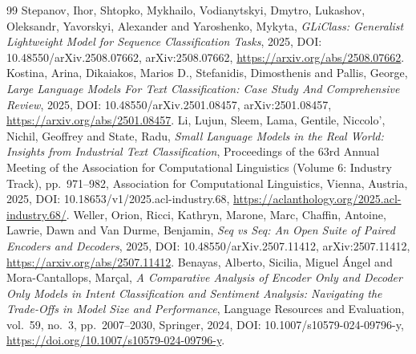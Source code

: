 \documentclass[10pt]{article}
\begin{document}
\begin{thebibliography}{99}
 Stepanov, Ihor, Shtopko, Mykhailo, Vodianytskyi, Dmytro, Lukashov, Oleksandr, Yavorskyi, Alexander and Yaroshenko, Mykyta, \emph{{GLiClass}: Generalist Lightweight Model for Sequence Classification Tasks}, 2025, DOI: 10.48550/arXiv.2508.07662, arXiv:2508.07662, \url{https://arxiv.org/abs/2508.07662}.
 Kostina, Arina, Dikaiakos, Marios D., Stefanidis, Dimosthenis and Pallis, George, \emph{Large Language Models For Text Classification: Case Study And Comprehensive Review}, 2025, DOI: 10.48550/arXiv.2501.08457, arXiv:2501.08457, \url{https://arxiv.org/abs/2501.08457}.
 Li, Lujun, Sleem, Lama, Gentile, Niccolo', Nichil, Geoffrey and State, Radu, \emph{Small Language Models in the Real World: Insights from Industrial Text Classification}, Proceedings of the 63rd Annual Meeting of the Association for Computational Linguistics (Volume 6: Industry Track), pp.~971--982, Association for Computational Linguistics, Vienna, Austria, 2025, DOI: 10.18653/v1/2025.acl-industry.68, \url{https://aclanthology.org/2025.acl-industry.68/}.
 Weller, Orion, Ricci, Kathryn, Marone, Marc, Chaffin, Antoine, Lawrie, Dawn and Van Durme, Benjamin, \emph{Seq vs Seq: An Open Suite of Paired Encoders and Decoders}, 2025, DOI: 10.48550/arXiv.2507.11412, arXiv:2507.11412, \url{https://arxiv.org/abs/2507.11412}.
 Benayas, Alberto, Sicilia, Miguel {\'A}ngel and Mora-Cantallops, Mar{\c c}al, \emph{A Comparative Analysis of Encoder Only and Decoder Only Models in Intent Classification and Sentiment Analysis: Navigating the Trade-Offs in Model Size and Performance}, Language Resources and Evaluation, vol.~59, no.~3, pp.~2007--2030, Springer, 2024, DOI: 10.1007/s10579-024-09796-y, \url{https://doi.org/10.1007/s10579-024-09796-y}.
\end{thebibliography}
\end{document}
